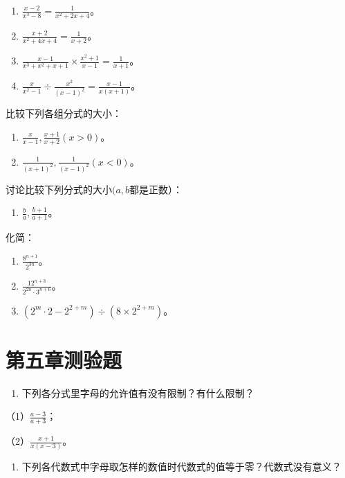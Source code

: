 \begin{enumerate}[start=15]
\item
  \(\frac{x - 2}{x^3 - 8} = \frac{1}{x^2 + 2x + 4}\)。
\item
  \(\frac{x + 2}{x^2 + 4x + 4} = \frac{1}{x + 2}\)。
\item
  \(\frac{x - 1}{x^3 + x^2 + x + 1} \times \frac{x^2 + 1}{x - 1} = \frac{1}{x + 1}\)。
\item
  \(\frac{x}{x^2 - 1} \div \frac{x^2}{(x - 1)^2} = \frac{x - 1}{x(x + 1)}\)。
\end{enumerate}

比较下列各组分式的大小：

\begin{enumerate}[start=19]
\item
  \(\frac{x}{x - 1}, \frac{x + 1}{x + 2} (x > 0)\)。
\item
  \(\frac{1}{(x + 1)^2}, \frac{1}{(x - 1)^2} (x < 0)\)。
\end{enumerate}

讨论比较下列分式的大小\((a, b\)都是正数）：

\begin{enumerate}[start=21]
\item
  \(\frac{b}{a}, \frac{b + 1}{a + 1}\)。
\end{enumerate}

化简：

\begin{enumerate}[start=22]
\item
  \(\frac{8^{n+1}}{2^{3n}}\)。
\item
  \(\frac{12^{n+3}}{2^{2n} \cdot 3^{n+6}}\)。
\item
  \((2^{m} \cdot 2 - 2^{2 + m}) \div (8 \times 2^{2 + m})\)。
\end{enumerate}

\section{第五章测验题}

\begin{enumerate}
\item
  下列各分式里字母的允许值有没有限制？有什么限制？
\end{enumerate}

（1）\(\frac{a - 3}{a + 3}\)；

（2）\(\frac{x + 1}{x(x - 3)}\)。

\begin{enumerate}[start=2]
\item
  下列各代数式中字母取怎样的数值时代数式的值等于零？代数式没有意义？
\end{enumerate}

